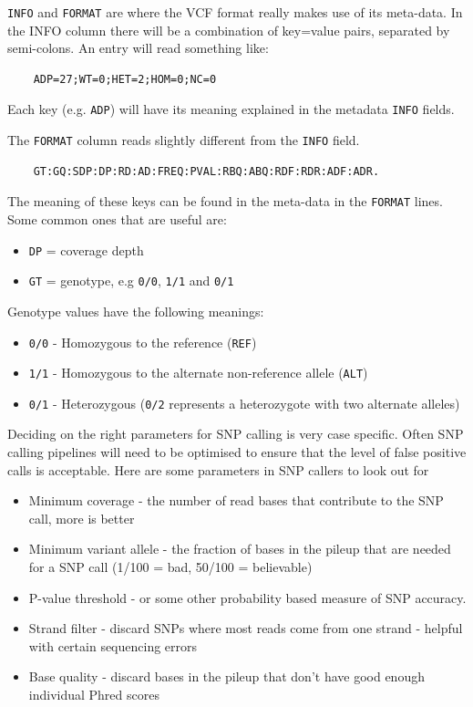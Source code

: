 \documentclass[12pt,]{book}
\providecommand{\tightlist}{%
  \setlength{\itemsep}{0pt}\setlength{\parskip}{0pt}}
\begin{document}
\texttt{INFO} and \texttt{FORMAT} are where the VCF format really makes
use of its meta-data. In the INFO column there will be a combination of
key=value pairs, separated by semi-colons. An entry will read something
like:

\begin{verbatim}
    ADP=27;WT=0;HET=2;HOM=0;NC=0
\end{verbatim}

Each key (e.g. \texttt{ADP}) will have its meaning explained in the
metadata \texttt{INFO} fields.

The \texttt{FORMAT} column reads slightly different from the
\texttt{INFO} field.

\begin{verbatim}
    GT:GQ:SDP:DP:RD:AD:FREQ:PVAL:RBQ:ABQ:RDF:RDR:ADF:ADR. 
\end{verbatim}

The meaning of these keys can be found in the meta-data in the
\texttt{FORMAT} lines. Some common ones that are useful are:

\begin{itemize}
\tightlist
\item
  \texttt{DP} = coverage depth
\item
  \texttt{GT} = genotype, e.g \texttt{0/0}, \texttt{1/1} and
  \texttt{0/1}
\end{itemize}

Genotype values have the following meanings:

\begin{itemize}
\tightlist
\item
  \texttt{0/0} - Homozygous to the reference (\texttt{REF})
\item
  \texttt{1/1} - Homozygous to the alternate non-reference allele
  (\texttt{ALT})
\item
  \texttt{0/1} - Heterozygous (\texttt{0/2} represents a heterozygote
  with two alternate alleles)
\end{itemize}

Deciding on the right parameters for SNP calling is very case specific.
Often SNP calling pipelines will need to be optimised to ensure that the
level of false positive calls is acceptable. Here are some parameters in
SNP callers to look out for

\begin{itemize}
\tightlist
\item
  Minimum coverage - the number of read bases that contribute to the SNP
  call, more is better
\item
  Minimum variant allele - the fraction of bases in the pileup that are
  needed for a SNP call (1/100 = bad, 50/100 = believable)
\item
  P-value threshold - or some other probability based measure of SNP
  accuracy.
\item
  Strand filter - discard SNPs where most reads come from one strand -
  helpful with certain sequencing errors
\item
  Base quality - discard bases in the pileup that don't have good enough
  individual Phred scores
\end{itemize}
\end{document}
